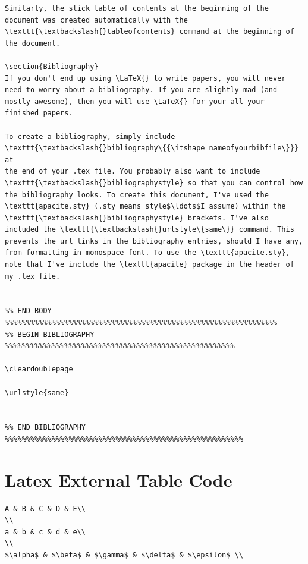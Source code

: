 \documentclass[12pt]{article}
\begin{document}
\begin{verbatim}
Similarly, the slick table of contents at the beginning of the
document was created automatically with the
\texttt{\textbackslash{}tableofcontents} command at the beginning of
the document.

\section{Bibliography}
If you don't end up using \LaTeX{} to write papers, you will never
need to worry about a bibliography. If you are slightly mad (and
mostly awesome), then you will use \LaTeX{} for your all your 
finished papers.

To create a bibliography, simply include
\texttt{\textbackslash{}bibliography\{{\itshape nameofyourbibfile\}}} at
the end of your .tex file. You probably also want to include
\texttt{\textbackslash{}bibliographystyle} so that you can control how
the bibliography looks. To create this document, I've used the
\texttt{apacite.sty} (.sty means style$\ldots$I assume) within the
\texttt{\textbackslash{}bibliographystyle} brackets. I've also
included the \texttt{\textbackslash{}urlstyle\{same\}} command. This
prevents the url links in the bibliography entries, should I have any,
from formatting in monospace font. To use the \texttt{apacite.sty},
note that I've include the \texttt{apacite} package in the header of
my .tex file.


%% END BODY %%%%%%%%%%%%%%%%%%%%%%%%%%%%%%%%%%%%%%%%%%%%%%%%%%%%%%%%%%%%%%%%
%% BEGIN BIBLIOGRAPHY %%%%%%%%%%%%%%%%%%%%%%%%%%%%%%%%%%%%%%%%%%%%%%%%%%%%%%

\cleardoublepage

\urlstyle{same}


%% END BIBLIOGRAPHY %%%%%%%%%%%%%%%%%%%%%%%%%%%%%%%%%%%%%%%%%%%%%%%%%%%%%%%%
\end{verbatim}

\section{Latex External Table Code}
\footnotesize
\begin{verbatim}
A & B & C & D & E\\
\\ 
a & b & c & d & e\\
\\
$\alpha$ & $\beta$ & $\gamma$ & $\delta$ & $\epsilon$ \\
\end{verbatim}
\end{document}
